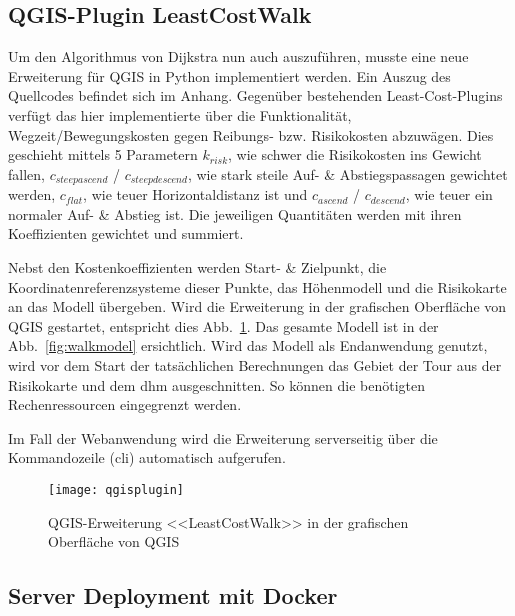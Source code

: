 \subsection{QGIS-Plugin LeastCostWalk}

Um den Algorithmus von Dijkstra nun auch auszuführen, musste eine neue Erweiterung für QGIS in Python implementiert werden. Ein Auszug des Quellcodes befindet sich im Anhang. Gegenüber bestehenden Least-Cost-Plugins verfügt das hier implementierte über die Funktionalität, Wegzeit/Bewegungskosten gegen Reibungs- bzw. Risikokosten abzuwägen. Dies geschieht mittels 5 Parametern $k_{risk}$, wie schwer die Risikokosten ins Gewicht fallen, $c_{steepascend}$ / $c_{steepdescend}$, wie stark steile Auf- \& Abstiegspassagen gewichtet werden, $c_{flat}$, wie teuer Horizontaldistanz ist und $c_{ascend}$ / $c_{descend}$, wie teuer ein normaler Auf- \& Abstieg ist. Die jeweiligen Quantitäten werden mit ihren Koeffizienten gewichtet und summiert.

Nebst den Kostenkoeffizienten werden Start- \& Zielpunkt, die Koordinatenreferenzsysteme dieser Punkte, das Höhenmodell und die Risikokarte an das Modell übergeben. Wird die Erweiterung in der grafischen Oberfläche von QGIS gestartet, entspricht dies Abb.\ \ref{fig:qgisplugin}. Das gesamte Modell ist in der Abb.\ \ref{fig:walkmodel} ersichtlich. Wird das Modell als Endanwendung genutzt, wird vor dem Start der tatsächlichen Berechnungen das Gebiet der Tour aus der Risikokarte und dem \acrshort{dhm} ausgeschnitten. So können die benötigten Rechenressourcen eingegrenzt werden.

Im Fall der Webanwendung wird die Erweiterung serverseitig über die Kommandozeile (\acrshort{cli}) automatisch aufgerufen.

\begin{figure}[H]
  \centering
  \texttt{[image: qgisplugin]}
  \caption{QGIS-Erweiterung <<LeastCostWalk>> in der grafischen Oberfläche von QGIS}\label{fig:qgisplugin}
\end{figure}

\subsection{Server Deployment mit Docker}

